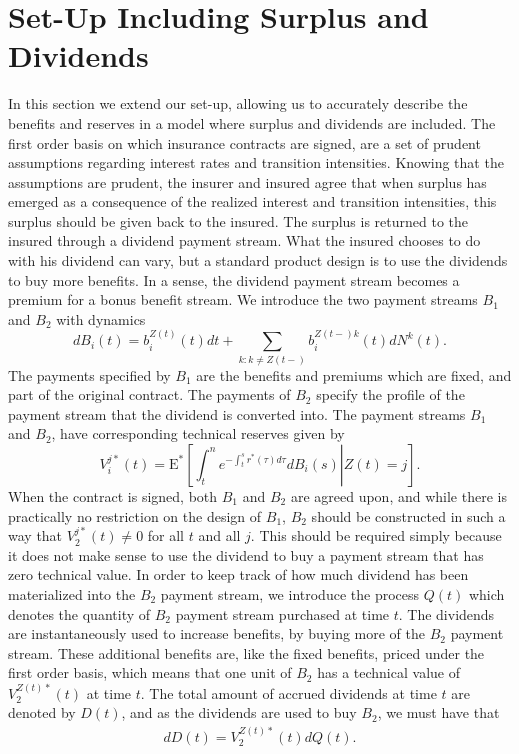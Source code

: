 \documentclass[12pt]{article}
\newcommand{\E}{\text{E}}
\theoremstyle{my_thm}
\theoremstyle{my_rem}
\begin{document}
\section{Set-Up Including Surplus and Dividends} \label{sec:Set_2}
In this section we extend our set-up, allowing us to accurately describe the benefits and reserves in a model where surplus and dividends are included. The first order basis on which insurance contracts are signed, are a set of prudent assumptions regarding interest rates and transition intensities. Knowing that the assumptions are prudent, the insurer and insured agree that when surplus has emerged as a consequence of the realized interest and transition intensities, this surplus should be given back to the insured. The surplus is returned to the insured through a dividend payment stream. What the insured chooses to do with his dividend can vary, but a standard product design is to use the dividends to buy more benefits. In a sense, the dividend payment stream becomes a premium for a bonus benefit stream. We introduce the two payment streams $B_1$ and $B_2$ with dynamics
$$
dB_i(t)=b_i^{Z(t)}(t) dt +\sum_{k:k \neq Z(t-)} b_i^{Z(t-)k}(t)dN^k(t).
$$
The payments specified by $B_1$ are the benefits and premiums which are fixed, and part of the original contract. The payments of $B_2$ specify the profile of the payment stream that the dividend is converted into. The payment streams $B_1$ and $B_2$, have corresponding technical reserves given by
$$
V_i^{j*}(t)=\E^* \left. \left[ \int_t^n e^{-\int_t^s r^*(\tau) d\tau} dB_i(s) \right| Z(t)=j \right].
$$
When the contract is signed, both $B_1$ and $B_2$ are agreed upon, and while there is practically no restriction on the design of $B_1$, $B_2$ should be constructed in such a way that $V_2^{j*}(t)\neq 0$ for all $t$ and all $j$. This should be required simply because it does not make sense to use the dividend to buy a payment stream that has zero technical value. In order to keep track of how much dividend has been materialized into the $B_2$ payment stream, we introduce the process $Q(t)$ which denotes the quantity of $B_2$ payment stream purchased at time $t$. The dividends are instantaneously used to increase benefits, by buying more of the $B_2$ payment stream. These additional benefits are, like the fixed benefits, priced under the first order basis, which means that one unit of $B_2$ has a technical value of $V_2^{Z(t)*}(t)$ at time $t$. The total amount of accrued dividends at time $t$ are denoted by $D(t)$, and as the dividends are used to buy $B_2$, we must have that
\begin{align}
dD(t)=V_2^{Z(t)*}(t)dQ(t). \label{eq:AAQ}
\end{align}
\end{document}
